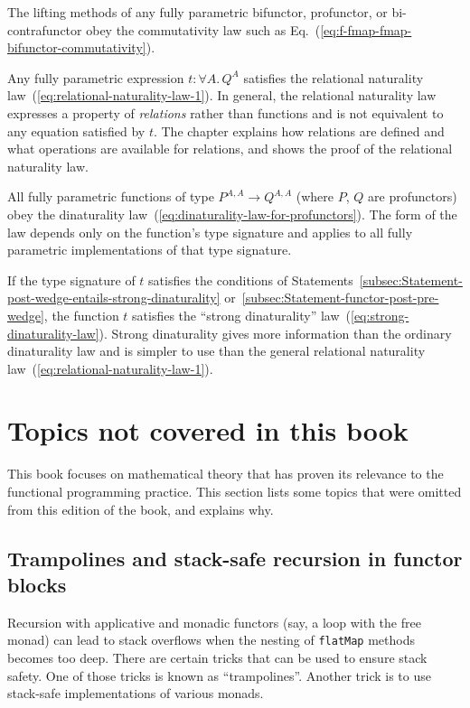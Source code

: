 The lifting methods of any fully parametric bifunctor, profunctor,
or bi-contrafunctor obey the commutativity law such as Eq.~(\ref{eq:f-fmap-fmap-bifunctor-commutativity}). 

Any fully parametric expression $t:\forall A.\,Q^{A}$ satisfies the
relational naturality law~(\ref{eq:relational-naturality-law-1}).
In general, the relational naturality law expresses a property of
\emph{relations} rather than functions and is not equivalent to any
equation satisfied by $t$. The chapter explains how relations are
defined and what operations are available for relations, and shows
the proof of the relational naturality law.

All fully parametric functions of type $P^{A,A}\rightarrow Q^{A,A}$
(where $P$, $Q$ are profunctors) obey the dinaturality law~(\ref{eq:dinaturality-law-for-profunctors}).
The form of the law depends only on the function\textsf{'}s type signature
and applies to all fully parametric implementations of that type signature.

If the type signature of $t$ satisfies the conditions of Statements~\ref{subsec:Statement-post-wedge-entails-strong-dinaturality}
or~\ref{subsec:Statement-functor-post-pre-wedge}, the function $t$
satisfies the \textsf{``}strong dinaturality\textsf{''} law~(\ref{eq:strong-dinaturality-law}).
Strong dinaturality gives more information than the ordinary dinaturality
law and is simpler to use than the general relational naturality law~(\ref{eq:relational-naturality-law-1}).

\setcounter{secnumdepth}{3}%
\begin{comment}
Restore the normal numbering of subsections and subsubsections
\end{comment}


\section{Topics not covered in this book}

This book focuses on mathematical theory that has proven its relevance
to the functional programming practice. This section lists some topics
that were omitted from this edition of the book, and explains why.

\subsection{Trampolines and stack-safe recursion in functor blocks}

Recursion with applicative and monadic functors (say, a loop with
the free monad) can lead to stack overflows when the nesting of \lstinline!flatMap!
methods becomes too deep. There are certain tricks that can be used
to ensure stack safety. One of those tricks is known as \textsf{``}trampolines\textsf{''}.
Another trick is to use stack-safe implementations of various monads. 

